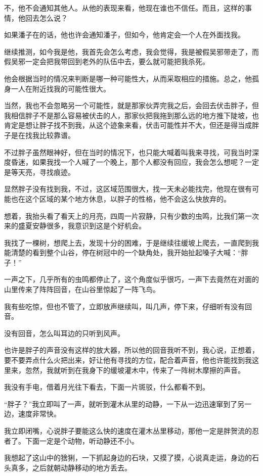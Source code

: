 不，他不会通知其他人。从他的表现来看，他现在谁也不信任。而且，这样的事情，他回去怎么说？

如果潘子在的话，他也许会通知潘子，但如今，他肯定会一个人在外面找我。

继续推测，如今我是他，我首先会怎么考虑，我会觉得，我是被假吴邪带走了，而假吴邪一定会把我带回到老外的队伍中去，要么就可能把我杀死。

他会根据当时的情况来判断是哪一种可能性大，从而采取相应的措施。总之，他孤身一人在附近找我的可能性很大。

当然，我也不会忽略另一个可能性，就是那家伙弄完我之后，会回去伏击胖子，但我相信胖子不是那么容易被伏击的人，那家伙把我拖到那么远的地方推下陡坡，也肯定是想让胖子找不到我，从这个迹象来看，伏击可能性并不大，但还是得当成胖子是在找我比较靠谱。

不过胖子虽然眼神好，但在当时的情况下，也只能大喊着叫我来寻找，可我当时深度昏迷，如果我找一个人喊了一个晚上，那个人都没有回应，我会怎么想呢？一定是等天亮，寻找痕迹。

显然胖子没有找到我，不过，这区域范围很大，找一天未必能找完，他现在很有可能也在这个区域的某个地方休息，以胖子的性格，他不会这么快放弃的。

想着，我抬头看了看天上的月亮，四周一片寂静，只有少数的虫鸣，比我们第一次来的盛夏安静很多，我意识到这是个好机会。

我找了一棵树，想爬上去，发现十分的困难，于是继续往缓坡上爬去，一直爬到我能清楚的看到整个山谷，停在树冠中的一个缺角处，我开始扯起嗓子大喊：“胖子！”

一声之下，几乎所有的虫鸣都停止了，这个角度似乎很巧，一声下去竟然在对面的山里传来了阵阵回音，在山谷里惊起了一阵飞鸟。

我有些吃惊，但也不管了，立即放声继续叫，叫几声，停下来，仔细听有没有回音。

没有回音，怎么叫耳边的只听到风声。

也许是胖子的声音没有这样的放大器，所以他的回音我听不到，我心说，正想着，要不要弄点什么火把出来，好让他有寻找的方位，配合着声音，他也许能找到我这里来，忽然，我就听到在我身下的缓坡灌木中，传来了一阵树木摩擦的声音。

我没有手电，借着月光往下看去，下面一片斑驳，什么都看不到。

“胖子？”我立即叫了一声，就听到灌木从里的动静，一下从一边迅速窜到了另一边，速度非常快。

我立即闭嘴，心说胖子要能这么快的速度在灌木丛里移动，那他一定是胖贺流的忍者了。下面一定是个动物，听动静还不小。

我想起了这山中的猞猁，一下抓起身边的石块，又摸了摸，心说真走运，身边的石头真多，之后就朝动静移动的地方丢去。

